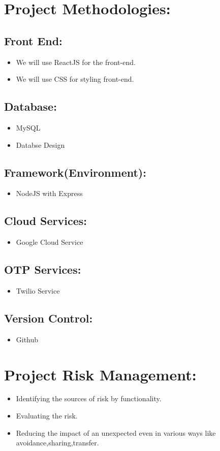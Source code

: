 \documentclass[13pt]{extarticle}
\begin{document}
\section{\textbf{Project Methodologies:}}
\subsection{Front End:}
\begin{itemize}
    \item We will use ReactJS for the front-end.
    \item We will use CSS for styling front-end.
\end{itemize}
\subsection{Database:}
\begin{itemize}
    \item MySQL
    \item Databse Design
\end{itemize}
\subsection{Framework(Environment):}
\begin{itemize}
    \item NodeJS with Express
\end{itemize}
\subsection{Cloud Services:}
\begin{itemize}
    \item Google Cloud Service
\end{itemize}
\subsection{OTP Services:}
\begin{itemize}
    \item Twilio Service
\end{itemize}
\subsection{Version Control:}
\begin{itemize}
    \item Github
\end{itemize}
\section{\textbf{Project Risk Management:}}
\begin{itemize}
    \item Identifying the sources of risk by functionality.
    \item Evaluating the risk.
    \item Reducing the impact of an unexpected even in various ways like avoidance,sharing,transfer.
\end{itemize}
\newpage
\end{document}
